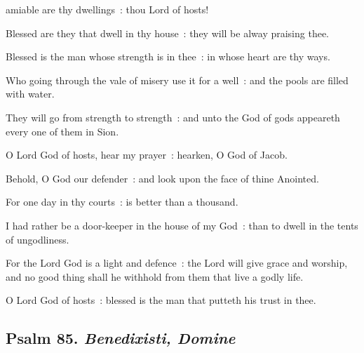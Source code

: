  amiable are thy dwellings~: thou Lord of hosts!\par
{}
Blessed are they that dwell in thy house~: they will be alway praising thee.\par
{}Blessed is the man whose strength is in thee~: in whose heart are thy ways.\par
{}Who going through the vale of misery use it for a well~: and the pools are filled with water.\par
{}They will go from strength to strength~: and unto the God of gods appeareth every one of them in Sion.\par
{}O Lord God of hosts, hear my prayer~: hearken, O God of Jacob.\par
{}Behold, O God our defender~: and look upon the face of thine Anointed.\par
{}For one day in thy courts~: is better than a thousand.\par
{}I had rather be a door-keeper in the house of my God~: than to dwell in the tents of ungodliness.\par
{}For the Lord God is a light and defence~: the Lord will give grace and worship, and no good thing shall he withhold from them that live a godly life.\par
{}O Lord God of hosts~: blessed is the man that putteth his trust in thee.\par

\subsection{Psalm 85. \textit{Benedixisti, Domine}}

